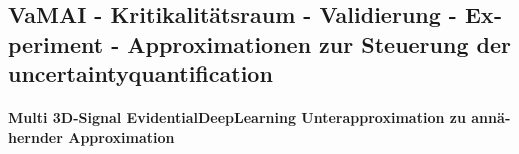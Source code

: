 \begin{otherlanguage}{ngerman}












\subsection*{VaMAI - Kritikalitätsraum - Validierung - Experiment - Approximationen zur Steuerung der \gls{uncertaintyquantification}}

\paragraph{Multi 3D-Signal \gls{EvidentialDeepLearning} Unterapproximation zu annähernder Approximation} 


\end{otherlanguage}
